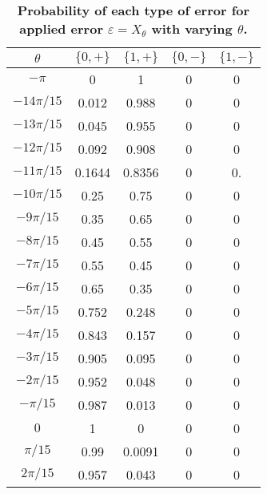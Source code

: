 \documentclass[superscriptaddress,twocolumn,showpacs,prb]{revtex4-1}
\begin{document}
\begin{table}[h!]
\begin{center}
 \begin{tabular}{c c c c c} 
 \hline
 \hline
 $\theta$ & $\{0 , +\}$ & $\{1 , +\}$&$\{0 , -\}$&$\{1 , -\}$ \\ [0.5ex] 
 \hline
 \hline
 $-\pi$ &0 &1 &0&0   \\ 
 \hline
 $-14\pi/15$ &0.012 &0.988&0&0  \\
 \hline
 $-13\pi/15$ & 0.045&0.955&0&0\\
 \hline
 $-12\pi/15$ & 0.092&0.908&0&0   \\  
\hline
 $-11\pi/15$ & 0.1644&0.8356&0&0.   \\ 
 \hline
 $-10\pi/15$ & 0.25&0.75&0&0 \\
 \hline
  $-9\pi/15$&0.35&0.65&0&0\\
  \hline
  $-8\pi/15$&0.45&0.55&0&0\\
  \hline
  $-7\pi/15$&0.55&0.45&0&0\\
  \hline
   $-6\pi/15$&0.65&0.35&0&0\\
  \hline
  $-5\pi/15$&0.752&0.248&0&0\\
  \hline
 $-4\pi/15$&0.843&0.157&0&0\\
  \hline
   $-3\pi/15$&0.905&0.095&0&0\\
  \hline
  $-2\pi/15$&0.952&0.048&0&0\\
  \hline
  $-\pi/15$&0.987&0.013&0&0\\
  \hline
  $0$&1&0&0&0\\
  \hline
  $\pi/15$&0.99&0.0091&0&0\\
  \hline
 $2\pi/15$&0.957&0.043&0&0\\
  [1ex] 
 \hline
 \hline
\end{tabular}
\caption{\textbf{Probability of each type of error for applied error $\varepsilon=X_{\theta}$ with varying $\theta$.}}
\label{qed_table2}
\end{center}
\end{table}
\end{document}
